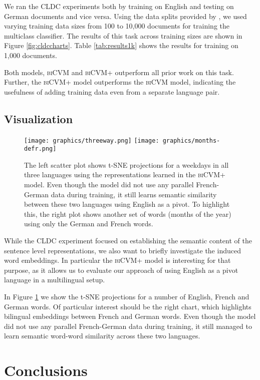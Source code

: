 \documentclass{article} \pdfoutput=1
\newcommand{\biCVM}{\textsc{biCVM}\xspace}
\newcommand{\biCVMplus}{\textsc{biCVM+}\xspace}
\begin{document}
We ran the CLDC experiments both by training on English and testing on German
documents and vice versa.  Using the data splits provided by
\cite{Klementiev:2012}, we used varying training data sizes from 100 to 10,000
documents for training the multiclass classifier.  The results of this task
across training sizes are shown in Figure \ref{fig:cldccharts}.  Table
\ref{tab:results1k} shows the results for training on 1,000 documents.

Both models, \biCVM and \biCVMplus outperform all prior work on this task.
Further, the \biCVMplus model outperforms the \biCVM model, indicating the
usefulness of adding training data even from a separate language pair.

\subsection{Visualization}

\begin{figure}[t]
\texttt{[image: graphics/threeway.png]}
\texttt{[image: graphics/months-defr.png]}
\caption{The left scatter plot shows t-SNE projections for a weekdays in all
  three languages using the representations learned in the \biCVMplus model.
  Even though the model did not use any parallel French-German data during
  training, it still learns semantic similarity between these two languages
  using English as a pivot. To highlight this, the right plot shows another set
  of words (months of the year) using only the German and French
  words.}\label{fig:scatterdefr}
\end{figure}

While the CLDC experiment focused on establishing the semantic content of the
sentence level representations, we also want to briefly investigate the induced
word embeddings.  In particular the \biCVMplus model is interesting for that
purpose, as it allows us to evaluate our approach of using English as a pivot
language in a multilingual setup.

In Figure \ref{fig:scatterdefr} we show the t-SNE projections for a number of
English, French and German words.  Of particular interest should be the right
chart, which highlights bilingual embeddings between French and German words.
Even though the model did not use any parallel French-German data during
training, it still managed to learn semantic word-word similarity across these
two languages.
 \section{Conclusions}
\end{document}
